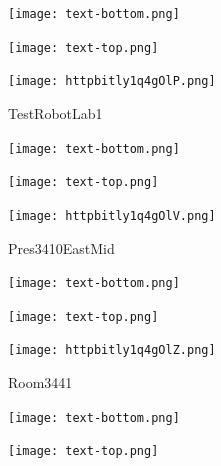 \documentclass[letterpaper]{article}
\begin{document}
 \centerline{\texttt{[image: text-bottom.png]}} 
 
 \pagebreak 
{} 
 \vspace*{\fill} 
 
  \centerline{\texttt{[image: text-top.png]}} 
 
 \vspace{0.5in} 
 
 \begingroup 
 \centerline{\texttt{[image: httpbitly1q4gOlP.png]}} 
 \endgroup 
 \vspace*{\fill} 

 \hfill{\small TestRobotLab1} 

  \vspace{0.7in} 
 
 \centerline{\texttt{[image: text-bottom.png]}} 
 
 \pagebreak 
{} 
 \vspace*{\fill} 
 
  \centerline{\texttt{[image: text-top.png]}} 
 
 \vspace{0.5in} 
 
 \begingroup 
 \centerline{\texttt{[image: httpbitly1q4gOlV.png]}} 
 \endgroup 
 \vspace*{\fill} 

 \hfill{\small Pres3410EastMid} 

  \vspace{0.7in} 
 
 \centerline{\texttt{[image: text-bottom.png]}} 
 
 \pagebreak 
{} 
 \vspace*{\fill} 
 
  \centerline{\texttt{[image: text-top.png]}} 
 
 \vspace{0.5in} 
 
 \begingroup 
 \centerline{\texttt{[image: httpbitly1q4gOlZ.png]}} 
 \endgroup 
 \vspace*{\fill} 

 \hfill{\small Room3441} 

  \vspace{0.7in} 
 
 \centerline{\texttt{[image: text-bottom.png]}} 
 
 \pagebreak 
{} 
 \vspace*{\fill} 
 
  \centerline{\texttt{[image: text-top.png]}} 
 
 \vspace{0.5in} 
 
\end{document}
